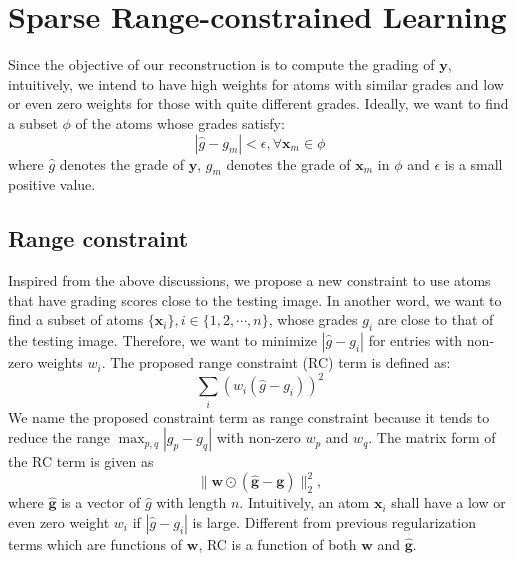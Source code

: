 \documentclass[journal]{IEEEtran}
\begin{document}
\section{Sparse Range-constrained Learning}\label{SRL}




Since the objective of our reconstruction is to compute the grading of $\textbf{y}$, intuitively, we intend to have high weights for  atoms with similar grades and low or even zero weights for those with quite different grades. Ideally, we want to find a subset $\phi$ of the atoms whose grades satisfy:
\begin{equation}
   |\hat{g}-g_m| < \epsilon,  \forall \textbf{x}_m \in \phi
\end{equation}
where $\hat{g}$ denotes the grade of $\textbf{y}$, $g_m$ denotes the grade of $\textbf{x}_m$ in $\phi$ and $\epsilon$ is a small positive value.
\subsection{Range constraint}
Inspired from the above discussions, we propose a new constraint to use
atoms that have grading scores close to the testing image. In another word, we want to find a
 subset of atoms $\{\textbf{x}_i \}, i\in \{1, 2, \cdots, n\}$, whose grades $g_i$ are close to that of the
 testing image. Therefore, we want to minimize $ |\hat{g}-g_i|$ for entries
 with non-zero weights $w_i$.   The proposed  range constraint (RC) term is defined as:
 \begin{equation}
    \sum_i (w_i(\hat{g}-g_i))^2
 \end{equation}
We name the proposed constraint term as range constraint because it tends to reduce the range
 $\max_{p,q}|g_p-g_q|$  with non-zero $w_p$ and $w_q$.
 The matrix form of the RC term is given as
 \begin{equation}
    \|\textbf{w}\odot (\hat{\textbf{g}} -\textbf{g})  \|_2^2,
 \end{equation}
 where $\hat{\textbf{g}}$ is a vector of $\hat{g}$ with length $n$.
  Intuitively, an atom $\textbf{x}_i$ shall have a low or even zero weight $w_i$ if    $|\hat{g}-g_i|$ is large.  %
 Different from previous regularization terms which are   functions of $\textbf{w}$, RC is a function of both $\textbf{w}$ and $\hat{\textbf{g}}$.
\end{document}
